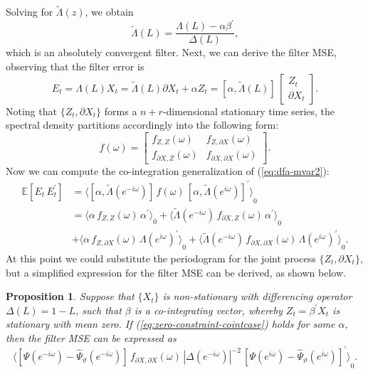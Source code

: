 \documentclass[a4paper]{book}
\def\EE{\mathbb E}
\newtheorem{Proposition}{Proposition}
\begin{document}
  Solving for $\widetilde{\Lambda} (z)$, we obtain
\[
  \widetilde{\Lambda} (L) = \frac{ \Lambda (L) - \alpha \beta^{\prime}}{ \Delta (L)},
\]
  which is an absolutely convergent filter.  Next, we can derive the filter MSE,
  observing that the filter error is
\[
  E_t = \Lambda (L) X_t = \widetilde{\Lambda} (L) \partial X_t + \alpha Z_t
   = [ \alpha,  \widetilde{\Lambda} (L) ] \, \left[ \begin{array}{c} Z_t \\ \partial X_t 
    \end{array} \right].
\]
  Noting that $ \{ Z_t, \partial X_t \}$ forms a $n+r$-dimensional stationary time series,
  the spectral density partitions accordingly into the following form:
\[
   f (\omega) =  \left[ \begin{array}{cc}
     f_{Z,Z} (\omega) &  f_{Z, \partial X} (\omega) \\ 
     f_{\partial X, Z} (\omega) & f_{\partial X, \partial X} (\omega)
     \end{array} \right].
\]
 Now we can compute the co-integration generalization of (\ref{eq:dfa-mvar2}):
\begin{align*}
\EE [ E_t \, E_t^{\prime} ]  & = 
   { \langle  [ \alpha,  \widetilde{\Lambda} (e^{-i \omega}) ]\,   f (\omega) \,
  {  [ \alpha,  \widetilde{\Lambda} (e^{i \omega}) ] }^{\prime} \rangle }_0 \\
  & = { \langle \alpha \, f_{Z,Z} (\omega) \, \alpha^{\prime} \rangle }_0
   + { \langle \widetilde{\Lambda} (e^{-i \omega}) \, f_{\partial X, Z} (\omega) \,
     \alpha^{\prime} \rangle }_0 \\
    & +  { \langle  \alpha \, f_{Z, \partial X} (\omega) \, { \Lambda (e^{i \omega})}^{\prime}
      \rangle }_0 
    + { \langle \widetilde{\Lambda} (e^{-i \omega}) \,
      f_{\partial X, \partial X} (\omega) \, { \Lambda (e^{i \omega})}^{\prime}
      \rangle }_0.
\end{align*}
  At this point we could substitute the periodogram for the joint process 
  $ \{ Z_t, \partial X_t \}$, but a simplified expression for the filter MSE can
   be derived, as shown below.

\begin{Proposition}
 \label{prop:coint-base-case}
  Suppose that $\{ X_t \}$ is non-stationary with differencing operator $\Delta (L) = 1-L$,
  such that $\beta$ is a co-integrating vector, whereby $Z_t = \beta^{\prime} X_t$ 
  is stationary with mean zero. If (\ref{eq:zero-constraint-cointcase}) holds for
   some $\alpha$, then the filter MSE can be expressed as
\[
   { \langle  \left[ \Psi (e^{-i \omega}) - 
   \widehat{\Psi}_{\vartheta} (e^{-i \omega}) \right] \, 
 f_{\partial X, \partial X} (\omega) \, {|\Delta (e^{-i \omega}) |}^{-2} \,
  {  \left[ \Psi (e^{i \omega}) -  
  \widehat{\Psi}_{\vartheta} (e^{i \omega}) \right] }^{\prime} \rangle }_0.
\]
\end{Proposition}
\end{document}
